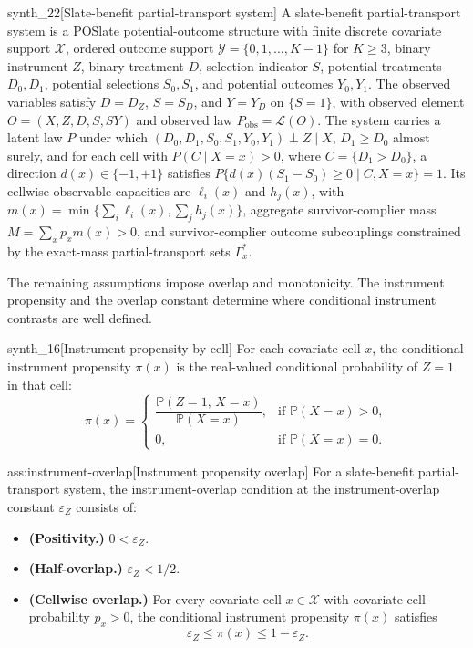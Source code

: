 \begin{definitionv}{synth_22}[Slate-benefit partial-transport system]
A slate-benefit partial-transport system is a POSlate potential-outcome structure with finite discrete covariate support \(\mathcal X\), ordered outcome support \(\mathcal Y=\{0,1,\ldots,K-1\}\) for \(K\ge3\), binary instrument \(Z\), binary treatment \(D\), selection indicator \(S\), potential treatments \(D_0,D_1\), potential selections \(S_0,S_1\), and potential outcomes \(Y_0,Y_1\). The observed variables satisfy \(D=D_Z\), \(S=S_D\), and \(Y=Y_D\) on \(\{S=1\}\), with observed element \(O=(X,Z,D,S,SY)\) and observed law \(P_{\mathrm{obs}}=\mathcal L(O)\). The system carries a latent law \(P\) under which \((D_0,D_1,S_0,S_1,Y_0,Y_1)\perp Z\mid X\), \(D_1\ge D_0\) almost surely, and for each cell with \(P(C\mid X=x)>0\), where \(C=\{D_1>D_0\}\), a direction \(d(x)\in\{-1,+1\}\) satisfies \(P\{d(x)(S_1-S_0)\ge0\mid C,X=x\}=1\). Its cellwise observable capacities are \(\ell_i(x)\) and \(h_j(x)\), with \(m(x)=\min\{\sum_i\ell_i(x),\sum_jh_j(x)\}\), aggregate survivor-complier mass \(M=\sum_xp_xm(x)>0\), and survivor-complier outcome subcouplings constrained by the exact-mass partial-transport sets \(\Gamma_x^{\ast}\).
\end{definitionv}

The remaining assumptions impose overlap and monotonicity. The instrument propensity  and the overlap constant  determine where conditional instrument contrasts are well defined.

\begin{definitionv}{synth_16}[Instrument propensity by cell]
For each covariate cell \(x\), the conditional instrument propensity \(\pi(x)\) is the real-valued conditional probability of \(Z=1\) in that cell:
\[
\pi(x)
=
\begin{cases}
\dfrac{\mathbb P(Z=1,\,X=x)}{\mathbb P(X=x)}, & \text{if } \mathbb P(X=x)>0,\\
0, & \text{if } \mathbb P(X=x)=0.
\end{cases}
\]
\end{definitionv}

\begin{assumptionv}{ass:instrument-overlap}[Instrument propensity overlap]
For a slate-benefit partial-transport system, the instrument-overlap condition at the instrument-overlap constant \(\varepsilon_Z\) consists of:
\begin{itemize}
\item \textbf{(Positivity.)} \(0<\varepsilon_Z\).
\item \textbf{(Half-overlap.)} \(\varepsilon_Z<1/2\).
\item \textbf{(Cellwise overlap.)} For every covariate cell \(x\in\mathcal X\) with covariate-cell probability \(p_x>0\), the conditional instrument propensity \(\pi(x)\) satisfies
\[
\varepsilon_Z\le \pi(x)\le 1-\varepsilon_Z .
\]
\end{itemize}
\end{assumptionv}

